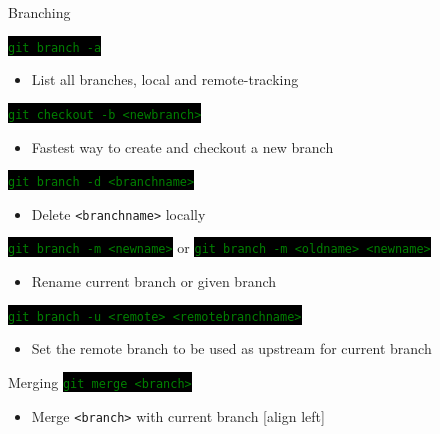 \documentclass[
14pt,
aspectratio=169,
usenames,
dvipsnames,
x11names]{beamer}
\newcommand{\code}[1]{{\small\setlength{\fboxsep}{2pt}\colorbox{black}{\textcolor{green}{\texttt{#1}}}}}
\begin{document}
\begin{frame}{Branching}

  \code{git branch -a}
  \begin{itemize}
  \item List all branches, local and remote-tracking
  \end{itemize}

  \vfill
  \pause

  \code{git checkout -b <newbranch>}
  \begin{itemize}
  \item Fastest way to create and checkout a new branch
  \end{itemize}

  \vfill
  \pause

  \code{git branch -d <branchname>}
  \begin{itemize}
  \item Delete \texttt{<branchname>} locally
  \end{itemize}

  \vfill
  \pause

  \code{git branch -m <newname>} or \code{git branch -m <oldname> <newname>}
  \begin{itemize}
  \item Rename current branch or given branch
  \end{itemize}

  \vfill
  \pause

  \code{git branch -u <remote> <remotebranchname>}
  \begin{itemize}
  \item Set the remote branch to be used as upstream for current branch
  \end{itemize}
\end{frame}

\begin{frame}{Merging}
  \code{git merge <branch>}
  \begin{itemize}
  \item Merge \texttt{<branch>} with current branch
    [align left]
  \end{itemize}
\end{frame}
\end{document}
